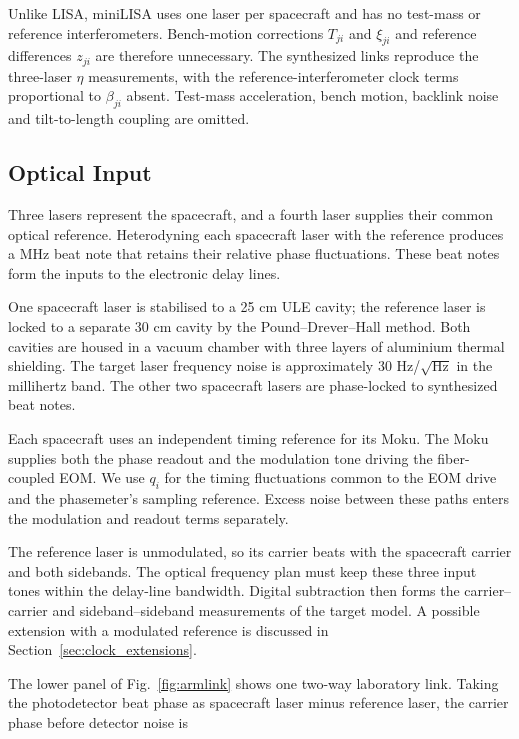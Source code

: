 \documentclass[aps,twocolumn,10pt,nofootinbib,floatfix]{revtex4-2}
\begin{document}
Unlike LISA, miniLISA uses one laser per spacecraft and has no test-mass or reference interferometers. Bench-motion corrections $T_{ji}$ and $\xi_{ji}$ and reference differences $z_{ji}$ are therefore unnecessary. The synthesized links reproduce the three-laser $\eta$ measurements, with the reference-interferometer clock terms proportional to $\beta_{ji}$ absent. Test-mass acceleration, bench motion, backlink noise and tilt-to-length coupling are omitted.

\subsection{Optical Input}
Three lasers represent the spacecraft, and a fourth laser supplies their common optical reference. Heterodyning each spacecraft laser with the reference produces a MHz beat note that retains their relative phase fluctuations. These beat notes form the inputs to the electronic delay lines.

One spacecraft laser is stabilised to a 25 cm \ac{ULE} cavity; the reference laser is locked to a separate 30 cm cavity by the Pound--Drever--Hall method. Both cavities are housed in a vacuum chamber with three layers of aluminium thermal shielding. The target laser frequency noise is approximately 30 Hz/$\sqrt{\mathrm{Hz}}$ in the millihertz band. The other two spacecraft lasers are phase-locked to synthesized beat notes.

Each spacecraft uses an independent timing reference for its Moku. The Moku supplies both the phase readout and the modulation tone driving the fiber-coupled EOM. We use $q_i$ for the timing fluctuations common to the EOM drive and the phasemeter's sampling reference. Excess noise between these paths enters the modulation and readout terms separately.

The reference laser is unmodulated, so its carrier beats with the spacecraft carrier and both sidebands. The optical frequency plan must keep these three input tones within the delay-line bandwidth. Digital subtraction then forms the carrier--carrier and sideband--sideband measurements of the target model. A possible extension with a modulated reference is discussed in Section~\ref{sec:clock_extensions}.

The lower panel of Fig.~\ref{fig:armlink} shows one two-way laboratory link. Taking the photodetector beat phase as spacecraft laser minus reference laser, the carrier phase before detector noise is
\end{document}
